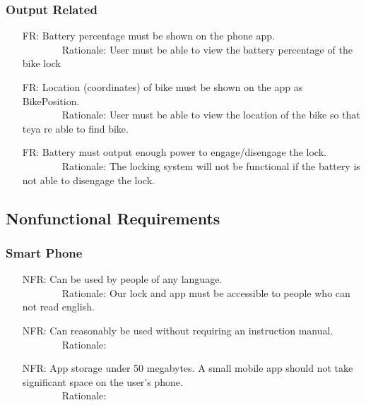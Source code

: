 \documentclass[12pt]{article}
\newcounter{reqnum} %
\newcounter{nfrnum} %
\begin{document}
\subsubsection{Output Related}
\begin{itemize}
\setlength{\itemindent}{.5in}
\item[FR\refstepcounter{reqnum}\thereqnum\label{FR11}:] Battery percentage must be shown on the phone app.
\\ \-\ \-\ \-\ \-\ \-\ \-\ \-\ \-\ Rationale: User must be able to view the battery percentage of the bike lock
\item[FR\refstepcounter{reqnum}\thereqnum\label{FR12}:] Location (coordinates) of bike must be shown on the app as BikePosition.
\\ \-\ \-\ \-\ \-\ \-\ \-\ \-\ \-\ Rationale: User must be able to view the location of the bike so that teya re able to find bike.
\item[FR\refstepcounter{reqnum}\thereqnum\label{FR13}:] Battery must output enough power to engage/disengage the lock.
\\ \-\ \-\ \-\ \-\ \-\ \-\ \-\ \-\ Rationale: The locking system will not be functional if the battery is not able to disengage the lock.
\end{itemize}

\subsection{Nonfunctional Requirements}

\subsubsection{Smart Phone}
\begin{itemize}
\setlength{\itemindent}{.5in}
\item[NFR\refstepcounter{nfrnum}\thenfrnum\label{NFR1}:] Can be used by people of any language.
\\ \-\ \-\ \-\ \-\ \-\ \-\ \-\ \-\ Rationale: Our lock and app must be accessible to people who can not read english.
\item[NFR\refstepcounter{nfrnum}\thenfrnum\label{NFR2}:] Can reasonably be used without requiring an instruction manual.
\\ \-\ \-\ \-\ \-\ \-\ \-\ \-\ \-\ Rationale:
\item[NFR\refstepcounter{nfrnum}\thenfrnum\label{NFR3}:] App storage under 50 megabytes. A small mobile app should not take significant space on the user's phone.
\\ \-\ \-\ \-\ \-\ \-\ \-\ \-\ \-\ Rationale: 
\end{itemize}
\end{document}

